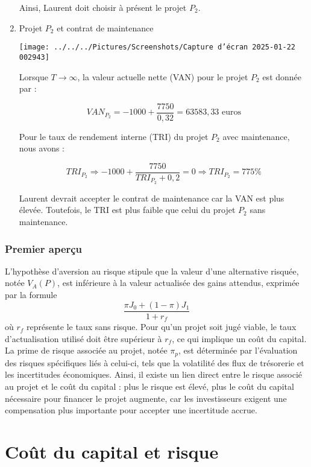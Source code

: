 \documentclass[a4paper, 12pt]{report}
\begin{document}
\begin{enumerate}
Ainsi, Laurent doit choisir à présent le projet \( P_2 \).

\item Projet \( P_2 \) et contrat de maintenance

\begin{center}
	
	\texttt{[image: ../../../Pictures/Screenshots/Capture d'écran 2025-01-22 002943]}

\end{center}

Lorsque \( T \to \infty \), la valeur actuelle nette (VAN) pour le projet \( P_2 \) est donnée par :

\[
VAN_{P_2} = -1000 + \frac{7750}{0,32} = 63583,33 \text{ euros}
\]

Pour le taux de rendement interne (TRI) du projet \( P_2 \) avec maintenance, nous avons :

\[
TRI_{P_2} \Rightarrow -1000 + \frac{7750}{TRI_{P_2} + 0,2} = 0 \Rightarrow TRI_{P_2} = 775\%
\]

Laurent devrait accepter le contrat de maintenance car la VAN est plus élevée. Toutefois, le TRI est plus faible que celui du projet \( P_2 \) sans maintenance.

\end{enumerate}

\subsection{Premier aperçu}

L'hypothèse d'aversion au risque stipule que la valeur d'une alternative risquée, notée \( V_A(P) \), est inférieure à la valeur actualisée des gains attendus, exprimée par la formule \[ \frac{\pi J_0 + (1 - \pi) J_1}{1 + r_f}  \]où \( r_f \) représente le taux sans risque. Pour qu'un projet soit jugé viable, le taux d'actualisation utilisé doit être supérieur à \( r_f \), ce qui implique un coût du capital. La prime de risque associée au projet, notée \( \pi_p \), est déterminée par l'évaluation des risques spécifiques liés à celui-ci, tels que la volatilité des flux de trésorerie et les incertitudes économiques. Ainsi, il existe un lien direct entre le risque associé au projet et le coût du capital : plus le risque est élevé, plus le coût du capital nécessaire pour financer le projet augmente, car les investisseurs exigent une compensation plus importante pour accepter une incertitude accrue.

\chapter{Coût du capital et risque}
\pagestyle{plain} 
\end{document}
